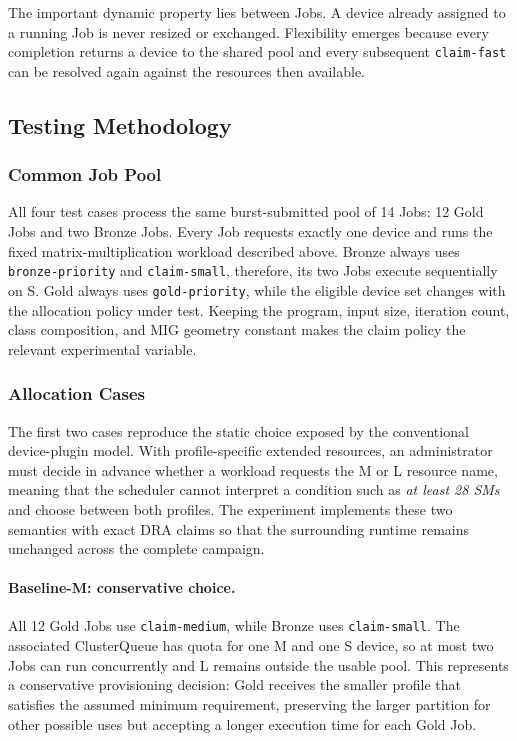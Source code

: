 The important dynamic property lies between Jobs. A device already assigned to a running Job is never resized or exchanged. Flexibility emerges because every completion returns a device to the shared pool and every subsequent \texttt{claim-fast} can be resolved again against the resources then available.

\subsection{Testing Methodology}
\label{subsec:kueue-methodology}

\subsubsection{Common Job Pool}

All four test cases process the same burst-submitted pool of 14 Jobs: 12 Gold Jobs and two Bronze Jobs. Every Job requests exactly one device and runs the fixed matrix-multiplication workload described above. Bronze always uses \texttt{bronze-priority} and \texttt{claim-small}, therefore, its two Jobs execute sequentially on S. Gold always uses \texttt{gold-priority}, while the eligible device set changes with the allocation policy under test. Keeping the program, input size, iteration count, class composition, and MIG geometry constant makes the claim policy the relevant experimental variable.

\subsubsection{Allocation Cases}

The first two cases reproduce the static choice exposed by the conventional device-plugin model. With profile-specific extended resources, an administrator must decide in advance whether a workload requests the M or L resource name, meaning that the scheduler cannot interpret a condition such as \emph{at least 28 SMs} and choose between both profiles. The experiment implements these two semantics with exact DRA claims so that the surrounding runtime remains unchanged across the complete campaign.

\paragraph{Baseline-M: conservative choice.}
All 12 Gold Jobs use \texttt{claim-medium}, while Bronze uses \texttt{claim-small}. The associated ClusterQueue has quota for one M and one S device, so at most two Jobs can run concurrently and L remains outside the usable pool. This represents a conservative provisioning decision: Gold receives the smaller profile that satisfies the assumed minimum requirement, preserving the larger partition for other possible uses but accepting a longer execution time for each Gold Job.

